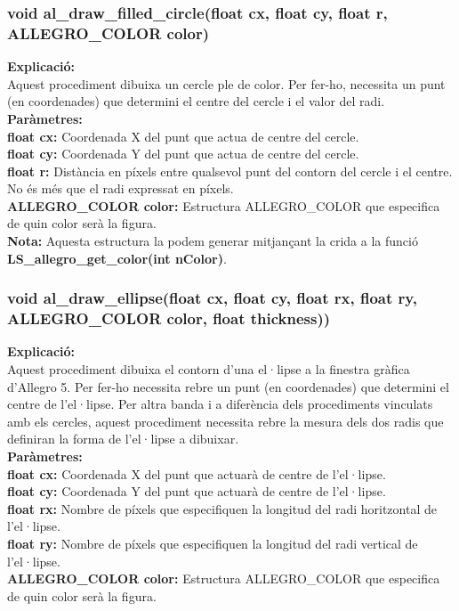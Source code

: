 \documentclass[11pt]{article}
\begin{document}
\newpage	
\subsubsection{void al\_draw\_filled\_circle(float cx, float cy, float r, ALLEGRO\_COLOR color)}
\textbf{Explicació:}\\
Aquest procediment dibuixa un cercle ple de color. Per fer-ho, necessita un punt (en coordenades) que determini el centre del cercle i el valor del radi.\\

\noindent \textbf{Paràmetres:}\\
\textbf{float cx:} Coordenada X del punt que actua de centre del cercle.\\
\textbf{float cy:} Coordenada Y del punt que actua de centre del cercle.\\
\textbf{float r:} Distància en píxels entre qualsevol punt del contorn del cercle i el centre. No és més que el radi expressat en píxels.\\
\textbf{ALLEGRO\_COLOR color:} Estructura ALLEGRO\_COLOR que especifica de quin color serà la figura.\\

\noindent \textbf{Nota:} Aquesta estructura la podem generar mitjançant la crida a la funció \textbf{LS\_allegro\_get\_color(int nColor)}.\\

\newpage		
\subsubsection{void al\_draw\_ellipse(float cx, float cy, float rx, float ry, ALLEGRO\_COLOR color, float thickness))}
\textbf{Explicació:}\\
Aquest procediment dibuixa el contorn d'una el·lipse a la finestra gràfica d'Allegro 5. Per fer-ho necessita rebre un punt (en coordenades) que determini el centre de l'el·lipse. Per altra banda i a diferència dels procediments vinculats amb els cercles, aquest procediment necessita rebre la mesura dels dos radis que definiran la forma de l'el·lipse a dibuixar.\\

\noindent \textbf{Paràmetres:}\\
\textbf{float cx:} Coordenada X del punt que actuarà de centre de l'el·lipse.\\
\textbf{float cy:} Coordenada Y del punt que actuarà de centre de l'el·lipse.\\
\textbf{float rx:} Nombre de píxels que especifiquen la longitud del radi horitzontal de l'el·lipse.\\
\textbf{float ry:} Nombre de píxels que especifiquen la longitud del radi vertical de l'el·lipse.\\
\textbf{ALLEGRO\_COLOR color:} Estructura ALLEGRO\_COLOR que especifica de quin color serà la figura.\\
\end{document}
